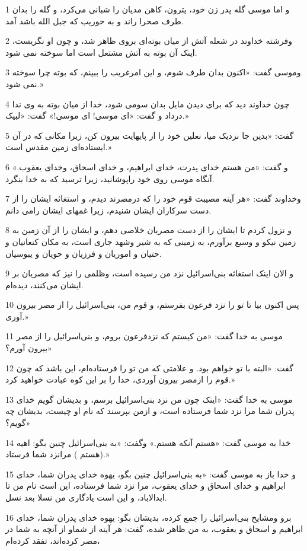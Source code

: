\par 1 و اما موسی گله پدر زن خود، یترون، کاهن مدیان را شبانی می‌کرد، و گله را بدان طرف صحرا راند و به حوریب که جبل الله باشد آمد.
\par 2 وفرشته خداوند در شعله آتش از میان بوته‌ای بروی ظاهر شد، و چون او نگریست، اینک آن بوته به آتش مشتعل است اما سوخته نمی شود.
\par 3 وموسی گفت: «اکنون بدان طرف شوم، و این امرغریب را ببینم، که بوته چرا سوخته نمی شود.»
\par 4 چون خداوند دید که برای دیدن مایل بدان سومی شود، خدا از میان بوته به وی ندا درداد و گفت: «ای موسی! ای موسی!» گفت: «لبیک.»
\par 5 گفت: «بدین جا نزدیک میا، نعلین خود را از پایهایت بیرون کن، زیرا مکانی که در آن ایستاده‌ای زمین مقدس است.»
\par 6 و گفت: «من هستم خدای پدرت، خدای ابراهیم، و خدای اسحاق، وخدای یعقوب.» آنگاه موسی روی خود راپوشانید، زیرا ترسید که به خدا بنگرد.
\par 7 وخداوند گفت: «هر آینه مصیبت قوم خود را که درمصرند دیدم، و استغاثه ایشان را از دست سرکاران ایشان شنیدم، زیرا غمهای ایشان رامی دانم.
\par 8 و نزول کردم تا ایشان را از دست مصریان خلاصی دهم، و ایشان را از آن زمین به زمین نیکو و وسیع برآورم، به زمینی که به شیر وشهد جاری است، به مکان کنعانیان و حتیان و اموریان و فرزیان و حویان و یبوسیان.
\par 9 و الان اینک استغاثه بنی‌اسرائیل نزد من رسیده است، وظلمی را نیز که مصریان بر ایشان می‌کنند، دیده‌ام.
\par 10 پس اکنون بیا تا تو را نزد فرعون بفرستم، و قوم من، بنی‌اسرائیل را از مصر بیرون آوری.»
\par 11 موسی به خدا گفت: «من کیستم که نزدفرعون بروم، و بنی‌اسرائیل را از مصر بیرون آورم؟»
\par 12 گفت: «البته با تو خواهم بود. و علامتی که من تو را فرستاده‌ام، این باشد که چون قوم را ازمصر بیرون آوردی، خدا را بر این کوه عبادت خواهید کرد.»
\par 13 موسی به خدا گفت: «اینک چون من نزد بنی‌اسرائیل برسم، و بدیشان گویم خدای پدران شما مرا نزد شما فرستاده است، و ازمن بپرسند که نام او چیست، بدیشان چه گویم؟»
\par 14 خدا به موسی گفت: «هستم آنکه هستم.» وگفت: «به بنی‌اسرائیل چنین بگو: اهیه (هستم ) مرانزد شما فرستاد.»
\par 15 و خدا باز به موسی گفت: «به بنی‌اسرائیل چنین بگو، یهوه خدای پدران شما، خدای ابراهیم و خدای اسحاق و خدای یعقوب، مرا نزد شما فرستاده، این است نام من تا ابدالاباد، و این است یادگاری من نسلا بعد نسل.
\par 16 برو ومشایخ بنی‌اسرائیل را جمع کرده، بدیشان بگو: یهوه خدای پدران شما، خدای ابراهیم و اسحاق و یعقوب، به من ظاهر شده، گفت: هر آینه از شماو از آنچه به شما در مصر کرده‌اند، تفقد کرده‌ام،
